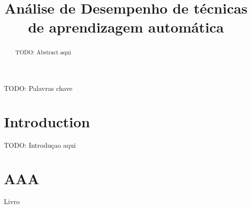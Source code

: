 \documentclass[conference]{IEEEtran}
\begin{document}
\title{Análise de Desempenho de técnicas de aprendizagem automática\\}

\author{
\and
{}
\and
{}
}

\maketitle

\begin{abstract}
TODO: Abstract aqui
\end{abstract}

\begin{IEEEkeywords}
TODO: Palavras chave
\end{IEEEkeywords}

\section{Introduction}
TODO: Introduçao aqui

\section{AAA}
























\begin{thebibliography}{00}
 Livro


\end{thebibliography}
\end{document}
